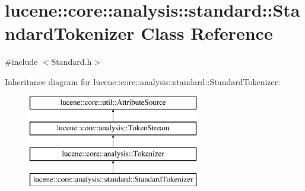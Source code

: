 \hypertarget{classlucene_1_1core_1_1analysis_1_1standard_1_1StandardTokenizer}{}\section{lucene\+:\+:core\+:\+:analysis\+:\+:standard\+:\+:Standard\+Tokenizer Class Reference}
\label{classlucene_1_1core_1_1analysis_1_1standard_1_1StandardTokenizer}


{\ttfamily \#include $<$Standard.\+h$>$}

Inheritance diagram for lucene\+:\+:core\+:\+:analysis\+:\+:standard\+:\+:Standard\+Tokenizer\+:\begin{figure}[H]
\begin{center}
\leavevmode
\includegraphics[height=4.000000cm]{classlucene_1_1core_1_1analysis_1_1standard_1_1StandardTokenizer}
\end{center}
\end{figure}
